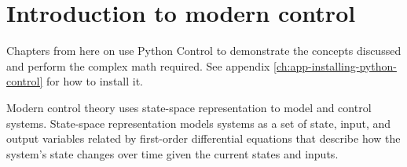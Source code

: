 
\chapter{Introduction to modern control}

\begin{remark}
  Chapters from here on use Python Control to demonstrate the concepts discussed
  and perform the complex math required. See appendix
  \ref{ch:app-installing-python-control} for how to install it.
\end{remark}

Modern control theory uses state-space representation to model and control
systems. State-space representation models \glspl{system} as a set of
\gls{state}, \gls{input}, and \gls{output} variables related by first-order
differential equations that describe how the \gls{system}'s \gls{state} changes
over time given the current \glspl{state} and \glspl{input}.





